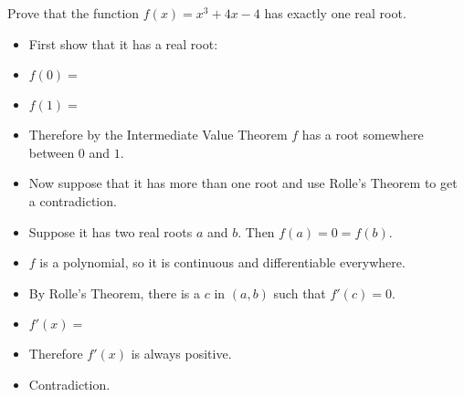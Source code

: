 \begin{frame}
\begin{example}
Prove that the function $f(x) = x^3 + 4x - 4$ has exactly one real root.
\begin{itemize}
\item<2->  First show that it has a real root:
\item<2-| alert@3-4>  $f(0) =$ 
\item<2-| alert@5-6>  $f(1) =$ 
\item<7->  Therefore by the Intermediate Value Theorem $f$ has a root somewhere between $0$ and $1$.
\item<8->  Now suppose that it has more than one root and use Rolle's Theorem to get a contradiction.
\item<9->  Suppose it has two real roots $a$ and $b$.  Then $f(a) = 0 = f(b)$.
\item<10->  $f$ is a polynomial, so it is continuous and differentiable everywhere.
\item<11->  By Rolle's Theorem, there is a $c$ in $(a,b)$ such that \alert<15>{$f'(c) = 0$}.
\item<12-| alert@12-13>  $f'(x) = $ 
\item<14->  Therefore \alert<15>{$f'(x)$ is always positive}.
\item<15-| alert@15>  Contradiction.
\end{itemize}
\end{example}
\end{frame}
